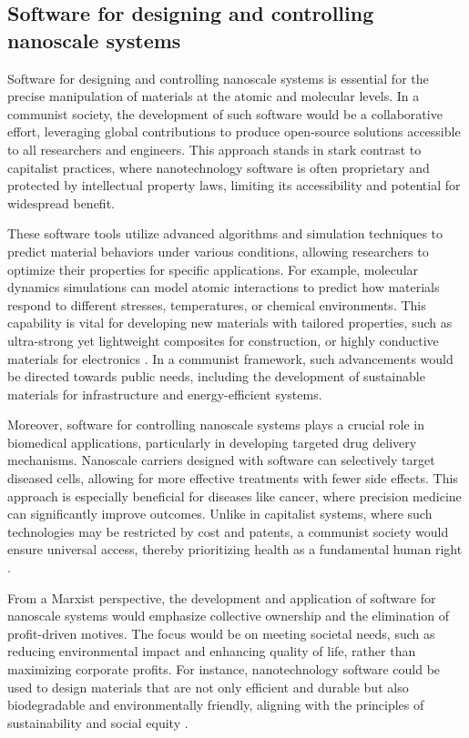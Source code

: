 \subsection{Software for designing and controlling nanoscale systems}

Software for designing and controlling nanoscale systems is essential for the precise manipulation of materials at the atomic and molecular levels. In a communist society, the development of such software would be a collaborative effort, leveraging global contributions to produce open-source solutions accessible to all researchers and engineers. This approach stands in stark contrast to capitalist practices, where nanotechnology software is often proprietary and protected by intellectual property laws, limiting its accessibility and potential for widespread benefit.

These software tools utilize advanced algorithms and simulation techniques to predict material behaviors under various conditions, allowing researchers to optimize their properties for specific applications. For example, molecular dynamics simulations can model atomic interactions to predict how materials respond to different stresses, temperatures, or chemical environments. This capability is vital for developing new materials with tailored properties, such as ultra-strong yet lightweight composites for construction, or highly conductive materials for electronics \cite[pp.~45-52]{drexler1986engines}. In a communist framework, such advancements would be directed towards public needs, including the development of sustainable materials for infrastructure and energy-efficient systems.

Moreover, software for controlling nanoscale systems plays a crucial role in biomedical applications, particularly in developing targeted drug delivery mechanisms. Nanoscale carriers designed with software can selectively target diseased cells, allowing for more effective treatments with fewer side effects. This approach is especially beneficial for diseases like cancer, where precision medicine can significantly improve outcomes. Unlike in capitalist systems, where such technologies may be restricted by cost and patents, a communist society would ensure universal access, thereby prioritizing health as a fundamental human right \cite[pp.~167-173]{freitas1999nanomedicine}.

From a Marxist perspective, the development and application of software for nanoscale systems would emphasize collective ownership and the elimination of profit-driven motives. The focus would be on meeting societal needs, such as reducing environmental impact and enhancing quality of life, rather than maximizing corporate profits. For instance, nanotechnology software could be used to design materials that are not only efficient and durable but also biodegradable and environmentally friendly, aligning with the principles of sustainability and social equity \cite[pp.~134-140]{ratner2003nanotechnology}.

